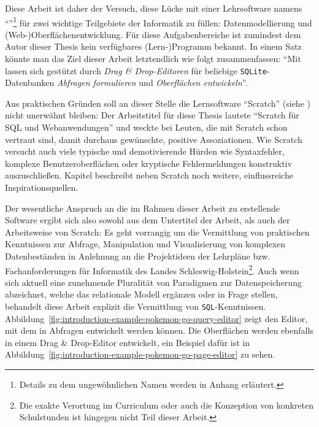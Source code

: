 Diese Arbeit ist daher der Versuch, diese Lücke mit einer Lehrsoftware namens "`\idename{}"'\footnote{Details zu dem ungewöhnlichen Namen werden in Anhang  erläutert.} für zwei wichtige Teilgebiete der Informatik zu füllen: Datenmodellierung und (Web-)Ober\-flächen\-ent\-wick\-lung. Für diese Aufgabenbereiche ist zumindest dem Autor dieser Thesis kein verfügbares (Lern-)Programm bekannt. In einem Satz könnte man das Ziel dieser Arbeit letztendlich wie folgt zusammenfassen: "`Mit \idename{} lassen sich gestützt durch \textit{Drag \& Drop-Editoren} für beliebige \texttt{SQLite}-Datenbanken \textit{Abfragen formulieren} und \textit{Oberflächen entwickeln}"'.


Aus praktischen Gründen soll an dieser Stelle die Lernsoftware "`Scratch"' (siehe ) nicht unerwähnt bleiben: Der Arbeitstitel für diese Thesis lautete "`Scr\-atch für SQL und Webanwendungen"' und weckte bei Leuten, die mit Scratch schon vertraut sind, damit durchaus gewünschte, positive Assoziationen. Wie Scratch versucht auch \idename{} viele typische und demotivierende Hürden wie Syntaxfehler, komplexe Benutzeroberflächen oder kryptische Fehlermeldungen konstruktiv auszuschließen. Kapitel  beschreibt neben Scratch noch weitere, einflussreiche Inspirationsquellen.

Der wesentliche Anspruch an die im Rahmen dieser Arbeit zu erstellende Software ergibt sich also sowohl aus dem Untertitel der Arbeit, als auch der Arbeitsweise von Scratch: Es geht vorrangig um die Vermittlung von praktischen Kenntnissen zur Abfrage, Manipulation und Visualisierung von komplexen Datenbeständen in Anlehnung an die Projektideen der Lehrpläne \cite{lehrplan-inf-sek-1} bzw. Fachanforderungen \cite{lehrplan-inf-sek-2} für Informatik des Landes Schleswig-Holstein\footnote{Die exakte Verortung im Curriculum oder auch die Konzeption von konkreten Schulstunden ist hingegen nicht Teil dieser Arbeit.}. Auch wenn sich aktuell eine zunehmende Pluralität von Paradigmen zur Datenspeicherung abzeichnet, welche das relationale Modell ergänzen oder in Frage stellen, behandelt diese Arbeit explizit die Vermittlung von \texttt{SQL}-Kenntnissen. Abbildung~\ref{fig:introduction-example-pokemon-go-query-editor} zeigt den Editor, mit dem in \idename{} Abfragen entwickelt werden können. Die Oberflächen werden ebenfalls in einem Drag \& Drop-Editor entwickelt, ein Beispiel dafür ist in Abbildung~\ref{fig:introduction-example-pokemon-go-page-editor} zu sehen.

